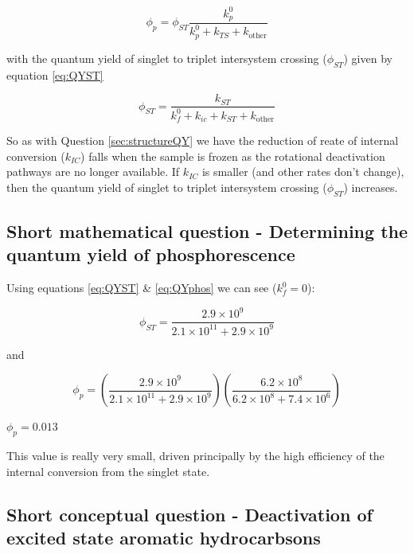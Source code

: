 \documentclass[
]{book}
\begin{document}
\begin{equation}
\phi_p = \phi_{ST}\frac{k_p^0}{k_p^0+ k_{TS}+k_{\textrm{other}}}
\label{eq:QYphos}
\end{equation}

with the quantum yield of singlet to triplet intersystem crossing (\(\phi_{ST}\)) given by equation \eqref{eq:QYST}

\begin{equation}
\phi_{ST} = \frac{k_{ST}}{k_f^0+k_{ic}+ k_{ST}+k_{\textrm{other}}}
\label{eq:QYST}
\end{equation}

So as with Question \ref{sec:structureQY} we have the reduction of reate of internal conversion (\(k_{IC}\)) falls when the sample is frozen as the rotational deactivation pathways are no longer available. If \(k_{IC}\) is smaller (and other rates don't change), then the quantum yield of singlet to triplet intersystem crossing (\(\phi_{ST}\)) increases.

\hypertarget{sec:calcphosans}{%
\subsection{Short mathematical question - Determining the quantum yield of phosphorescence}\label{sec:calcphosans}}

Using equations \eqref{eq:QYST} \& \eqref{eq:QYphos} we can see (\(k_f^0=0\)):

\begin{equation*}
\phi_{ST} = \frac{2.9 × 10^9}{2.1 × 10^{11}+2.9 × 10^9}
\end{equation*}

and

\begin{equation*}
\phi_p = \left(\frac{2.9 × 10^9}{2.1 × 10^{11}+2.9 × 10^9}\right)\left(\frac{6.2 × 10^8}{6.2 × 10^8+ 7.4 × 10^6}\right)
\end{equation*}

\(\phi_p=0.013\)

This value is really very small, driven principally by the high efficiency of the internal conversion from the singlet state.

\hypertarget{sec:exhydrocarbonsans}{%
\subsection{Short conceptual question - Deactivation of excited state aromatic hydrocarbsons}\label{sec:exhydrocarbonsans}}
\end{document}

